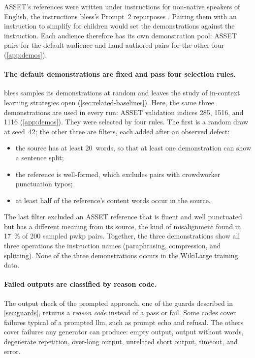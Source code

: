 ASSET's references were written under instructions for non-native speakers of English, the instructions \gls{bless}'s Prompt~2 repurposes \parencite[13294]{kew-etal-2023-bless}.
Pairing them with an instruction to simplify for children would set the demonstrations against the instruction.
Each audience therefore has its own demonstration pool: ASSET pairs for the default audience and hand-authored pairs for the other four (\cref{app:demos}).

\paragraph{The default demonstrations are fixed and pass four selection rules.}
\Gls{bless} samples its demonstrations at random and leaves the study of in-context learning strategies open (\cref{sec:related-baselines}).
Here, the same three demonstrations are used in every run: ASSET validation indices 285, 1516, and 1116 (\cref{app:demos}).
They were selected by four rules.
The first is a random draw at seed~42; the other three are filters, each added after an observed defect:
\begin{itemize}
	\item the source has at least 20~words, so that at least one demonstration can show a sentence split;
	\item the reference is well-formed, which excludes pairs with crowdworker punctuation typos;
	\item at least half of the reference's content words occur in the source.
\end{itemize}
The last filter excluded an ASSET reference that is fluent and well punctuated but has a different meaning from its source, the kind of misalignment \textcite[285]{xu-etal-2015-problems} found in \qty{17}{\percent} of \num{200} sampled \gls{pwkp} pairs.
Together, the three demonstrations show all three operations the instruction names (paraphrasing, compression, and splitting).
None of the three demonstrations occurs in the WikiLarge training data.

\paragraph{Failed outputs are classified by reason code.}
The output check of the prompted approach, one of the guards described in \cref{sec:guards}, returns a \emph{reason code} instead of a pass or fail.
Some codes cover failures typical of a prompted \gls{llm}, such as prompt echo and refusal.
The others cover failures any generator can produce: empty output, output without words, degenerate repetition, over-long output, unrelated short output, timeout, and error.

